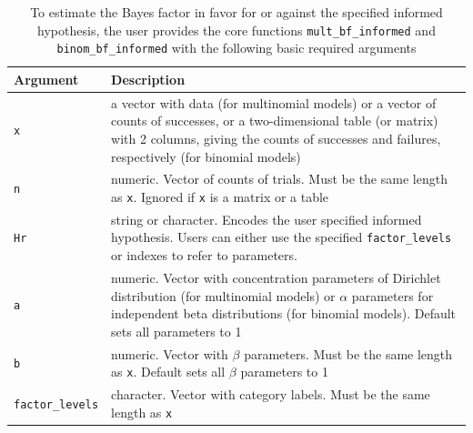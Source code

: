 \documentclass[
  english,
  man,floatsintext]{apa6}
\begin{document}
\begin{table}
\caption{To estimate the Bayes factor in favor for or against the specified informed hypothesis, the user provides the core functions \texttt{mult\_bf\_informed} and \texttt{binom\_bf\_informed} with the following basic required arguments}
\label{tab:arguments}
\begin{center}
\begin{tabular}{p{4cm}p{12cm}}
        \toprule
Argument & Description \\\midrule
\texttt{x} & a vector with data (for multinomial models) or a vector of counts of successes, or a two-dimensional table (or matrix) with 2 columns, giving the counts of successes and failures, respectively (for binomial models)  \\
\texttt{n} &  numeric. Vector of counts of trials. Must be the same length as \texttt{x}. Ignored if \texttt{x} is a matrix or a table \\
\texttt{Hr} & string or character. Encodes the user specified informed hypothesis. Users can either use the specified \texttt{factor\_levels} or indexes to refer to parameters.\\
\texttt{a} & numeric. Vector with concentration parameters of Dirichlet distribution (for multinomial models) or $\alpha$ parameters for independent beta distributions (for binomial models). Default sets all parameters to 1 \\
\texttt{b} & numeric. Vector with $\beta$ parameters. Must be the same length as \texttt{x}. Default sets all $\beta$ parameters to 1 \\
\texttt{factor\_levels} &  character. Vector with category labels. Must be the same length as \texttt{x}\\
\bottomrule
\end{tabular}
\end{center}
\end{table}
\end{document}
